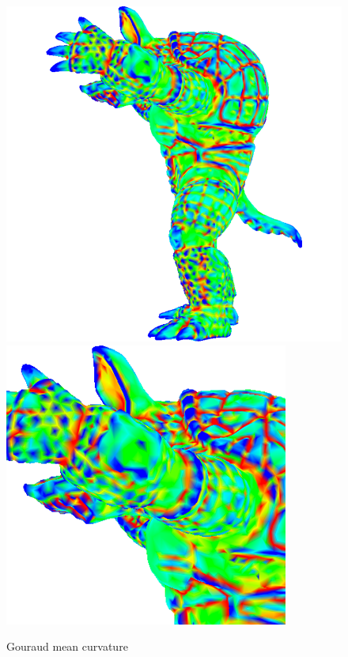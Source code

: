\begin{figure}[!h]
    \centering
    \centering
    \includegraphics[scale=0.24]{images/mean-curvature-vertex.png}
    \endminipage\hfill
    \centering
    \includegraphics[scale=0.5]{images/mean-curvature-vertex-detail.png}
    \endminipage
    \caption{Gouraud mean curvature} \label{fig:armadillo-mean-vertex}
\end{figure}


